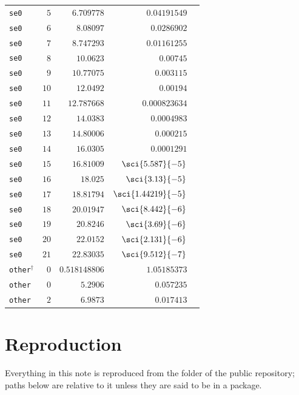 {\begin{longtable}{@{}lrrrr@{}}
\texttt{se0} & $5$ & $6.709778$ & $0.04191549$ & \\
\texttt{se0} & $6$ & $8.08097$ & $0.0286902$ & \\
\texttt{se0} & $7$ & $8.747293$ & $0.01161255$ & \\
\texttt{se0} & $8$ & $10.0623$ & $0.00745$ & \\
\texttt{se0} & $9$ & $10.77075$ & $0.003115$ & \\
\texttt{se0} & $10$ & $12.0492$ & $0.00194$ & \\
\texttt{se0} & $11$ & $12.787668$ & $0.000823634$ & \\
\texttt{se0} & $12$ & $14.0383$ & $0.0004983$ & \\
\texttt{se0} & $13$ & $14.80006$ & $0.000215$ & \\
\texttt{se0} & $14$ & $16.0305$ & $0.0001291$ & \\
\texttt{se0} & $15$ & $16.81009$ & $\sci{5.587}{-5}$ & \\
\texttt{se0} & $16$ & $18.025$ & $\sci{3.13}{-5}$ & \\
\texttt{se0} & $17$ & $18.81794$ & $\sci{1.44219}{-5}$ & \\
\texttt{se0} & $18$ & $20.01947$ & $\sci{8.442}{-6}$ & \\
\texttt{se0} & $19$ & $20.8246$ & $\sci{3.69}{-6}$ & \\
\texttt{se0} & $20$ & $22.0152$ & $\sci{2.131}{-6}$ & \\
\texttt{se0} & $21$ & $22.83035$ & $\sci{9.512}{-7}$ & \\
\texttt{other}$^\dagger$ & $0$ & $0.518148806$ & $1.05185373$ & \\
\texttt{other} & $0$ & $5.2906$ & $0.057235$ & \\
\texttt{other} & $2$ & $6.9873$ & $0.017413$ & \\
\end{longtable}
}

\section{Reproduction}\label{sri:app:repro}
Everything in this note is reproduced from the folder  of the public repository; paths below are relative
to it unless they are said to be in a package.

